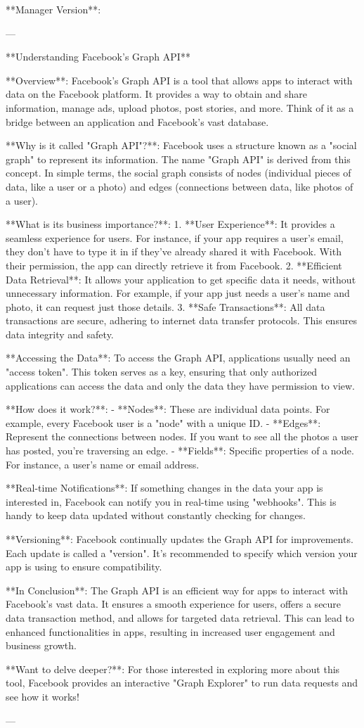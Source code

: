 **Manager Version**:

---

**Understanding Facebook's Graph API**

**Overview**:
Facebook's Graph API is a tool that allows apps to interact with data on the Facebook platform. It provides a way to obtain and share information, manage ads, upload photos, post stories, and more. Think of it as a bridge between an application and Facebook's vast database.

**Why is it called "Graph API"?**:
Facebook uses a structure known as a "social graph" to represent its information. The name "Graph API" is derived from this concept. In simple terms, the social graph consists of nodes (individual pieces of data, like a user or a photo) and edges (connections between data, like photos of a user).

**What is its business importance?**:
1. **User Experience**: It provides a seamless experience for users. For instance, if your app requires a user's email, they don't have to type it in if they've already shared it with Facebook. With their permission, the app can directly retrieve it from Facebook.
2. **Efficient Data Retrieval**: It allows your application to get specific data it needs, without unnecessary information. For example, if your app just needs a user's name and photo, it can request just those details.
3. **Safe Transactions**: All data transactions are secure, adhering to internet data transfer protocols. This ensures data integrity and safety.

**Accessing the Data**:
To access the Graph API, applications usually need an "access token". This token serves as a key, ensuring that only authorized applications can access the data and only the data they have permission to view.

**How does it work?**:
- **Nodes**: These are individual data points. For example, every Facebook user is a "node" with a unique ID.
- **Edges**: Represent the connections between nodes. If you want to see all the photos a user has posted, you're traversing an edge.
- **Fields**: Specific properties of a node. For instance, a user's name or email address.

**Real-time Notifications**:
If something changes in the data your app is interested in, Facebook can notify you in real-time using "webhooks". This is handy to keep data updated without constantly checking for changes.

**Versioning**:
Facebook continually updates the Graph API for improvements. Each update is called a "version". It's recommended to specify which version your app is using to ensure compatibility.

**In Conclusion**:
The Graph API is an efficient way for apps to interact with Facebook's vast data. It ensures a smooth experience for users, offers a secure data transaction method, and allows for targeted data retrieval. This can lead to enhanced functionalities in apps, resulting in increased user engagement and business growth.

**Want to delve deeper?**:
For those interested in exploring more about this tool, Facebook provides an interactive "Graph Explorer" to run data requests and see how it works!

---